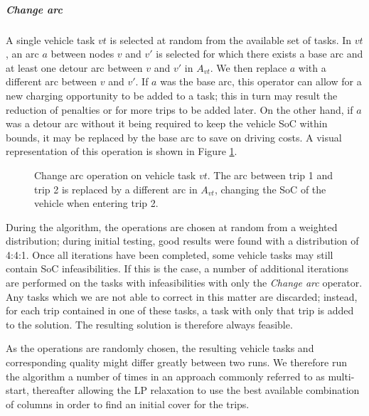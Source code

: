 \documentclass[]{article}
\begin{document}
\noindent\subparagraph{Change arc} A single vehicle task $vt$ is selected at random from the available set of tasks. In $vt$, an arc $a$ between nodes $v$ and $v'$ is selected for which there exists a base arc and at least one detour arc between $v$ and $v'$ in $A_{vt}$. We then replace $a$ with a different arc between $v$ and $v'$. If $a$ was the base arc, this operator can allow for a new charging opportunity to be added to a task; this in turn may result the reduction of penalties or for more trips to be added later. On the other hand, if $a$ was a detour arc without it being required to keep the vehicle SoC within bounds, it may be replaced by the base arc to save on driving costs. A visual representation of this operation is shown in Figure \ref{fig:changearc-vt}.
\begin{figure}[h]
  \centering
  \caption{Change arc operation on vehicle task $vt$. The arc between trip 1 and trip 2 is replaced by a different arc in $A_{vt}$, changing the SoC of the vehicle when entering trip 2.}
  \label{fig:changearc-vt}
\end{figure}

\noindent During the algorithm, the operations are chosen at random from a weighted distribution; during initial testing, good results were found with a distribution of 4:4:1. Once all iterations have been completed, some vehicle tasks may still contain SoC infeasibilities. If this is the case, a number of additional iterations are performed on the tasks with infeasibilities with only the \textit{Change arc} operator. Any tasks which we are not able to correct in this matter are discarded; instead, for each trip contained in one of these tasks, a task with only that trip is added to the solution. The resulting solution is therefore always feasible.

As the operations are randomly chosen, the resulting vehicle tasks and corresponding quality might differ greatly between two runs. We therefore run the algorithm a number of times in an approach commonly referred to as multi-start, thereafter allowing the LP relaxation to use the best available combination of columns in order to find an initial cover for the trips. 
\end{document}
